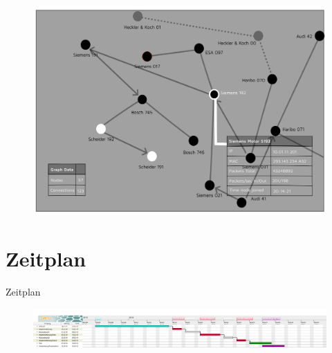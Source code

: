 \documentclass[18pt]{beamer}
\begin{document}
\begin{frame}
	\begin{figure}
		\includegraphics[height=0.95\textheight]{./images/GUI.png}
	\end{figure}
\end{frame}

\section{Zeitplan}
\begin{frame}{Zeitplan}
    \begin{figure}
      \centering
      \includegraphics[width=\textwidth]{./images/document.png}
    \end{figure}
\end{frame}

\appendix
\beginbackup


\backupend
\end{document}
